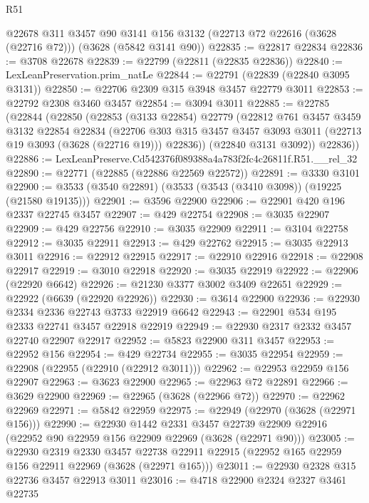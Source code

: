 \begin{lexlean}{R51}
\begin{coremodule}
    @22678
    @311
    @3457
    @90
    @3141
    @156
    @3132
    (@22713 @72 @22616 (@3628 (@22716 @72)))
    (@3628 (@5842 @3141 @90))
@22835 := @22817 @22834
@22836 := @3708 @22678
@22839 := @22799 (@22811 (@22835 @22836))
@22840 := LexLeanPreservation.prim_natLe
@22844 := @22791 (@22839 (@22840 @3095 @3131))
@22850 := @22706 @2309 @315 @3948 @3457 @22779 @3011
@22853 := @22792 @2308 @3460 @3457
@22854 := @3094 @3011
@22885 := @22785
    (@22844
      (@22850
        (@22853
          (@3133 @22854)
          @22779
          (@22812
            @761
            @3457
            @3459
            @3132
            @22854
            @22834
            (@22706
              @303
              @315
              @3457
              @3457
              @3093
              @3011
              (@22713 @19 @3093 (@3628 (@22716 @19)))
              @22836))
          (@22840 @3131 @3092))
        @22836))
@22886 := LexLeanPreserve.Cd542376f089388a4a783f2fc4c26811f.R51.__rel_32
@22890 := @22771 (@22885 (@22886 @22569 @22572))
@22891 := @3330 @3101
@22900 := @3533 (@3540 @22891) (@3533 (@3543 (@3410 @3098)) (@19225 (@21580 @19135)))
@22901 := @3596 @22900
@22906 := @22901 @420 @196 @2337 @22745 @3457
@22907 := @429 @22754
@22908 := @3035 @22907
@22909 := @429 @22756
@22910 := @3035 @22909
@22911 := @3104 @22758
@22912 := @3035 @22911
@22913 := @429 @22762
@22915 := @3035 @22913 @3011
@22916 := @22912 @22915
@22917 := @22910 @22916
@22918 := @22908 @22917
@22919 := @3010 @22918
@22920 := @3035 @22919
@22922 := @22906 (@22920 @6642)
@22926 := @21230 @3377 @3002 @3409 @22651
@22929 := @22922 (@6639 (@22920 @22926))
@22930 := @3614 @22900
@22936 := @22930 @2334 @2336 @22743 @3733 @22919 @6642
@22943 := @22901 @534 @195 @2333 @22741 @3457 @22918 @22919
@22949 := @22930 @2317 @2332 @3457 @22740 @22907 @22917
@22952 := @5823 @22900 @311 @3457
@22953 := @22952 @156
@22954 := @429 @22734
@22955 := @3035 @22954
@22959 := @22908 (@22955 (@22910 (@22912 @3011)))
@22962 := @22953 @22959 @156 @22907
@22963 := @3623 @22900
@22965 := @22963 @72 @22891
@22966 := @3629 @22900
@22969 := @22965 (@3628 (@22966 @72))
@22970 := @22962 @22969
@22971 := @5842 @22959
@22975 := @22949 (@22970 (@3628 (@22971 @156)))
@22990 := @22930
    @1442
    @2331
    @3457
    @22739
    @22909
    @22916
    (@22952 @90 @22959 @156 @22909 @22969 (@3628 (@22971 @90)))
@23005 := @22930
    @2319
    @2330
    @3457
    @22738
    @22911
    @22915
    (@22952 @165 @22959 @156 @22911 @22969 (@3628 (@22971 @165)))
@23011 := @22930 @2328 @315 @22736 @3457 @22913 @3011
@23016 := @4718 @22900 @2324 @2327 @3461 @22735

\end{coremodule}
\end{lexlean}

